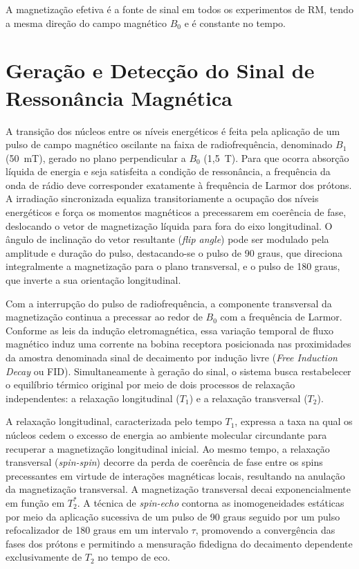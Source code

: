 \documentclass[a4paper,12pt,oneside,openright]{abntex2}
\begin{document}
A magnetização efetiva é a fonte de sinal em todos os experimentos de RM, tendo a mesma direção do campo magnético $B_0$ e é constante no tempo. 

\section{Geração e Detecção do Sinal de Ressonância Magnética}

A transição dos núcleos entre os níveis energéticos é feita pela aplicação de um pulso de campo magnético oscilante na faixa de radiofrequência, denominado $B_1$ (50~mT), gerado no plano perpendicular a $B_0$ (1,5~T). Para que ocorra absorção líquida de energia e seja satisfeita a condição de ressonância, a frequência da onda de rádio deve corresponder exatamente à frequência de Larmor dos prótons. A irradiação sincronizada equaliza transitoriamente a ocupação dos níveis energéticos e força os momentos magnéticos a precessarem em coerência de fase, deslocando o vetor de magnetização líquida para fora do eixo longitudinal. O ângulo de inclinação do vetor resultante (\textit{flip angle}) pode ser modulado pela amplitude e duração do pulso, destacando-se o pulso de 90 graus, que direciona integralmente a magnetização para o plano transversal, e o pulso de 180 graus, que inverte a sua orientação longitudinal.

Com a interrupção do pulso de radiofrequência, a componente transversal da magnetização continua a precessar ao redor de $B_0$ com a frequência de Larmor. Conforme as leis da indução eletromagnética, essa variação temporal de fluxo magnético induz uma corrente na bobina receptora posicionada nas proximidades da amostra denominada sinal de decaimento por indução livre (\textit{Free Induction Decay} ou FID). Simultaneamente à geração do sinal, o sistema busca restabelecer o equilíbrio térmico original por meio de dois processos de relaxação independentes: a relaxação longitudinal ($T_1$) e a relaxação transversal ($T_2$).

A relaxação longitudinal, caracterizada pelo tempo $T_1$, expressa a taxa na qual os núcleos cedem o excesso de energia ao ambiente molecular circundante para recuperar a magnetização longitudinal inicial. Ao mesmo tempo, a relaxação transversal (\textit{spin-spin}) decorre da perda de coerência de fase entre os spins precessantes em virtude de interações magnéticas locais, resultando na anulação da magnetização transversal. A magnetização transversal decai exponencialmente em função em $T_2^*$. A técnica de \textit{spin-echo} contorna as inomogeneidades estáticas por meio da aplicação sucessiva de um pulso de 90 graus seguido por um pulso refocalizador de 180 graus em um intervalo $\tau$, promovendo a convergência das fases dos prótons e permitindo a mensuração fidedigna do decaimento dependente exclusivamente de $T_2$ no tempo de eco.
\end{document}
